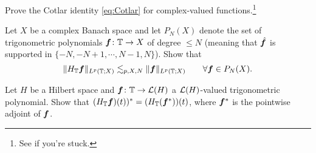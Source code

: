 \begin{exercise}\label{ex:Cotlar}
  Prove the Cotlar identity \eqref{eq:Cotlar} for complex-valued functions.\footnote{See \cite[.a]{HNVW16} if you're stuck.}
\end{exercise}

\begin{exercise}\label{ex:HT-FD}
  Let $X$ be a complex Banach space and let $P_{N}(X)$ denote the set of trigonometric polynomials $\bm{f} \colon \mathbb{T} \rightarrow X$ of degree $\leq N$ (meaning that $\hat{\bm{f}}$ is supported in $\{-N,-N+1,\cdots,N-1,N\}$).
  Show that 
  \begin{equation*}
    \|H_{\mathbb{T}} \bm{f}\|_{L^p(\mathbb{T};X)} \lesssim_{p,X,N} \|\bm{f}\|_{L^p(\mathbb{T};X)} \qquad \forall \bm{f} \in P_{N}(X).
  \end{equation*}
\end{exercise}

\begin{exercise}\label{ex:HT-adjoint-Schatten}
  Let $H$ be a Hilbert space and  $\bm{f} \colon \mathbb{T} \to \mathcal{L}(H)$ a $\mathcal{L}(H)$-valued trigonometric polynomial.
  Show that $(H_{\mathbb{T}} \bm{f})(t))^* = (H_{\mathbb{T}} (\bm{f}^*))(t)$, where $\bm{f}^*$ is the pointwise adjoint of $\bm{f}$.
\end{exercise}


